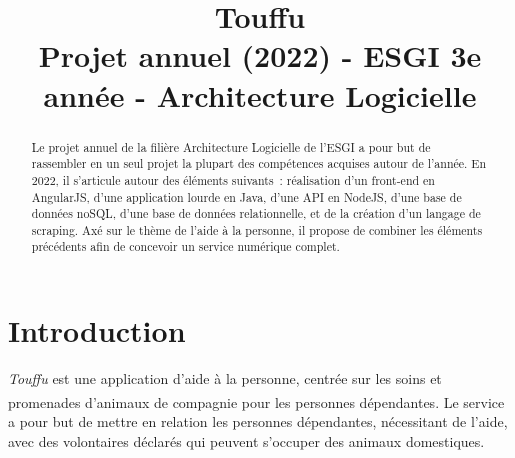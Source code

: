 \documentclass[conference]{IEEEtran}
\newcommand{\bibRef}[1]
{\textsuperscript{\cite{#1}}}
\begin{document}
\title{
Touffu\\
{\footnotesize
Projet annuel (2022) - ESGI 3e année - Architecture Logicielle}
}

\author{
\and
{}
\and
{}
}

\maketitle

\begin{abstract}
Le projet annuel de la filière Architecture Logicielle de l'ESGI a pour but de rassembler en un seul projet la plupart des compétences acquises autour de l'année. En 2022, il s'articule autour des éléments suivants : réalisation d'un front-end en AngularJS, d'une application lourde en Java, d'une API en NodeJS, d'une base de données noSQL, d'une base de données relationnelle, et de la création d'un langage de scraping. Axé sur le thème de l'aide à la personne, il propose de combiner les éléments précédents afin de concevoir un service numérique complet.
\end{abstract}

\section{Introduction}

\textit{Touffu} est une application d'aide à la personne, centrée sur les soins et promenades d'animaux de compagnie pour les personnes dépendantes\bibRef{Soins aux animaux}. Le service a pour but de mettre en relation les personnes dépendantes, nécessitant de l'aide, avec des volontaires déclarés qui peuvent s'occuper des animaux domestiques.\\
\end{document}
